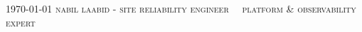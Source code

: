 \documentclass[localFont,alternative,10pt,compact]{yaac-another-awesome-cv}
\begin{document}
	\makecvheader

	\makecvfooter
		{\textsc{\today}} %
		{\textsc{nabil laabid - site reliability engineer \ \textbar \ platform \& observability expert}}
		{\thepage}


	
\end{document}
